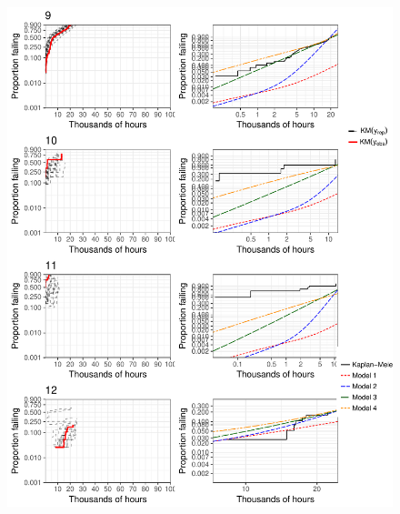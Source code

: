 \documentclass[12pt]{article}
\begin{document}
\begin{figure}[H]
\includegraphics[width=\textwidth]{ppcheck-v2-3.pdf}
\end{figure}
\end{document}
